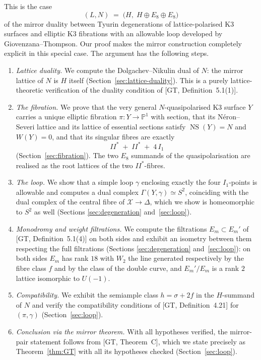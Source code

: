 \documentclass[11pt]{article}
\newcommand{\X}{\mathcal{X}}
\newcommand{\D}{\Delta}
\newcommand{\PP}{\mathbb{P}}
\DeclareMathOperator{\NS}{NS}
\begin{document}
This is the case
\[
(L,N) \;=\; \bigl(H,\;H\oplus E_8\oplus E_8\bigr)
\]
of the mirror duality between Tyurin degenerations of lattice-polarised K3
surfaces and elliptic K3 fibrations with an allowable loop developed by
Giovenzana--Thompson. Our proof makes the mirror construction completely
explicit in this special case. The argument has the following steps.

\begin{enumerate}[label=(\arabic*),leftmargin=2.2em]
\item \emph{Lattice duality.} We compute the Dolgachev--Nikulin dual of $N$:
the mirror lattice of $N$ is $H$ itself
(Section~\ref{sec:lattice-duality}). This is a purely lattice-theoretic
verification of the duality condition of [GT, Definition~5.1(1)].
\item \emph{The fibration.} We prove that the very general
$N$-quasipolarised K3 surface $Y$ carries a unique elliptic fibration
$\pi\colon Y\to\PP^1$ with section, that its N\'eron--Severi lattice and its
lattice of essential sections satisfy $\NS(Y)=N$ and $W(Y)=0$, and that its
singular fibres are exactly
\[
II^* \;+\; II^* \;+\; 4\,I_1
\]
(Section~\ref{sec:fibration}). The two $E_8$ summands of the
quasipolarisation are realised as the root lattices of the two
$II^*$-fibres.
\item \emph{The loop.} We show that a simple loop $\gamma$ enclosing exactly
the four $I_1$-points is allowable and computes a dual complex
$\Gamma(Y,\gamma)\simeq S^2$, coinciding with the dual complex of the
central fibre of $\X\to\D$, which we show is homeomorphic to $S^2$ as well
(Sections \ref{sec:degeneration} and~\ref{sec:loop}).
\item \emph{Monodromy and weight filtrations.} We compute the filtrations
$E_m\subset E_m'$ of [GT, Definition~5.1(4)] on both sides and exhibit an
isometry between them respecting the full filtrations
(Sections \ref{sec:degeneration} and~\ref{sec:loop}): on both sides
$E_m$ has rank $18$ with $W_2$ the line generated respectively by the fibre
class $f$ and by the class of the double curve, and $E_m'/E_m$ is a rank
$2$ lattice isomorphic to $U(-1)$.

\item \emph{Compatibility.} We exhibit the semiample class $h=\sigma+2f$ in
the $H$-summand of $N$ and verify the compatibility conditions of [GT,
Definition~4.21] for $(\pi,\gamma)$ (Section~\ref{sec:loop}).
\item \emph{Conclusion via the mirror theorem.} With all hypotheses
verified, the mirror-pair statement follows from [GT, Theorem~C], which we
state precisely as Theorem~\ref{thm:GT} with all its hypotheses checked
(Section~\ref{sec:loop}).
\end{enumerate}
\end{document}
